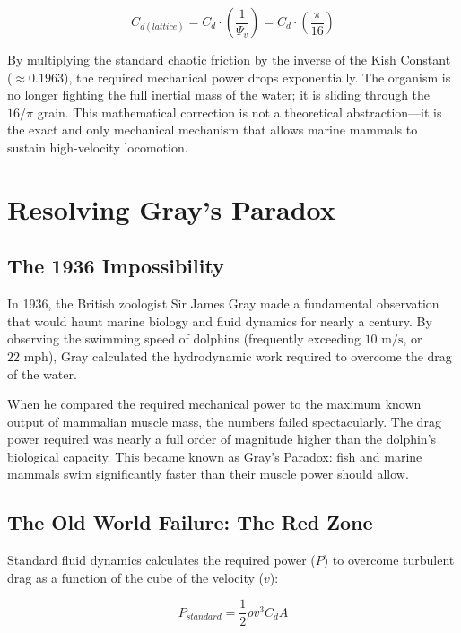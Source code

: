 \documentclass[11pt, letterpaper, openany]{book}
\begin{document}
\begin{equation}
C_{d(lattice)} = C_d \cdot \left( \frac{1}{\Psi_v} \right) = C_d \cdot \left( \frac{\pi}{16} \right)
\end{equation}

By multiplying the standard chaotic friction by the inverse of the Kish Constant ($\approx 0.1963$), the required mechanical power drops exponentially. The organism is no longer fighting the full inertial mass of the water; it is sliding through the $16/\pi$ grain. This mathematical correction is not a theoretical abstraction—it is the exact and only mechanical mechanism that allows marine mammals to sustain high-velocity locomotion.

\chapter{Resolving Gray's Paradox}

\section{The 1936 Impossibility}
In 1936, the British zoologist Sir James Gray made a fundamental observation that would haunt marine biology and fluid dynamics for nearly a century. By observing the swimming speed of dolphins (frequently exceeding $10 \text{ m/s}$, or $22 \text{ mph}$), Gray calculated the hydrodynamic work required to overcome the drag of the water. 

When he compared the required mechanical power to the maximum known output of mammalian muscle mass, the numbers failed spectacularly. The drag power required was nearly a full order of magnitude higher than the dolphin's biological capacity. This became known as Gray's Paradox: fish and marine mammals swim significantly faster than their muscle power should allow.

\section{The Old World Failure: The Red Zone}
Standard fluid dynamics calculates the required power ($P$) to overcome turbulent drag as a function of the cube of the velocity ($v$):

\begin{equation}
P_{standard} = \frac{1}{2} \rho v^3 C_d A
\end{equation}
\end{document}
